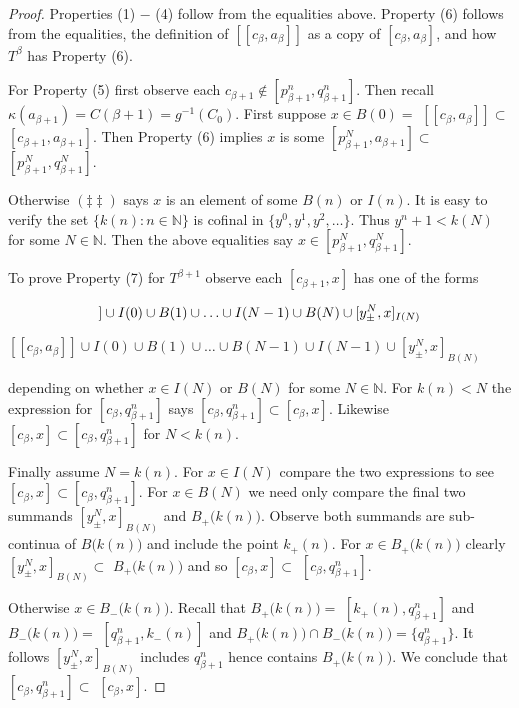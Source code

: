 \documentclass[12pt]{article}
\theoremstyle{plain}
\theoremstyle{definition}
\newcommand{\K}{\ensuremath{\kappa}}
\newcommand{\B}{\ensuremath{\beta}}
\newcommand{\NN}{\ensuremath{\mathbb N}}
\newcommand{\0}{\ensuremath{\varnothing}}
\begin{document}
	\begin{proof}
		Properties (1) $-$ (4) follow from the equalities above.
		Property (6) follows from the equalities, the definition of $[[c_{\B}, a_{\B} ]]$ as a copy of $[c_{\B}, a_{\B} ]$,
		and how $T^\B$ has Property (6).
		
		For Property (5) first observe each $c_{\B+1} \notin [p^n_{\B+1}, q^n_{\B+1}]$.
		Then recall $\K(a_{\B+1}) = C(\B+1) = g^{-1}(C_0)$.
		First suppose $x \in B(0) = $ $[[c_{\B}, a_{\B}]] \subset $ $[c_{\B+1}, a_{\B+1}]$.
		Then Property (6) implies $x$ is some $[p^N_{\B+1}, a_{\B+1}] \subset $ $[p^N_{\B+1}, q^N_{\B+1}]$.
		
		Otherwise $(\ddag \ddag)$  says $x$ is an element of some $B(n)$ or $I(n)$.
		It is easy to verify the set $\{k(n):n \in \NN\}$ is cofinal in $\{y^0,y^1,y^2,\ldots\}$.
		Thus $y^n +1 < k(N)$ for some $N \in \NN$.
		Then the above equalities say  $x \in [p^{N}_{\B+1}, q^{N}_{\B+1}]$.
		
		To prove Property (7) for $T^{\B+1}$ observe each $[c_{\B+1},x]$ has one of the forms
		
		\begin{equation}
		[[c_\B,a_\B]] \cup I(0) \cup B(1) \cup \ldots \cup I({N-1}) \cup B({N}) \cup [y^N_{\pm},x]_{I(N)} \notag
		\end{equation}
		
		
		\begin{center}
			$[[c_\B,a_\B]] \cup I(0) \cup B(1) \cup \ldots \cup  B({N-1}) \cup I(N-1) \cup [y^{N}_{\pm},x]_{B(N)}$
		\end{center}
		
		depending on whether $x \in I(N)$ or $B(N)$ for some $N \in \NN$.
		For $k(n) < N$ the expression for $[c_\B,q^n_{\B+1}]$ says $[c_\B,q^n_{\B+1}] \subset [c_\B,x]$.
		Likewise $[c_\B,x] \subset [c_\B,q^n_{\B+1}]$ for $N < k(n)$.
		
		Finally assume $N = k(n)$. 
		For $x \in I(N)$ compare the two expressions to see $[c_\B,x] \subset [c_\B,q^n_{\B+1}]$.
		For $x \in B(N)$ we need only compare the final two summands $[y^{N}_{\pm},x]_{B(N)}$ and $B_{+} \big (k(n) \big )$.
		Observe both summands are sub- continua of $B \big (k(n) \big )$ and include the point $k_+(n)$.
		For $x \in B_{+} \big (k(n) \big )$ clearly $[y^{N}_{\pm},x]_{B(N)} \subset $ $B_{+} \big (k(n) \big )$ and so $[c_\B,x] \subset $ $[c_\B,q^n_{\B+1}]$.
		
		Otherwise $x \in B_{-} \big (k(n) \big )$.
		Recall that \mbox{$B_{+} \big (k(n) \big ) = $} $[k_+(n), q^n_{\B+1}]$ and $B_{-} \big (k(n) \big ) = $ $[q^n_{\B+1}, k_-(n)]$
		and $B_{+} \big (k(n) \big ) \cap B_{-} \big (k(n) \big ) = \{q^n_{\B+1}\}$.
		It follows $[y^{N}_{\pm},x]_{B(N)}$  includes $q^n_{\B+1}$ hence contains $B_{+} \big (k(n) \big ) $.
		We conclude that $[c_\B,q^n_{\B+1}] \subset $ $ [c_\B,x]$.
	\end{proof}
	
\end{document}

